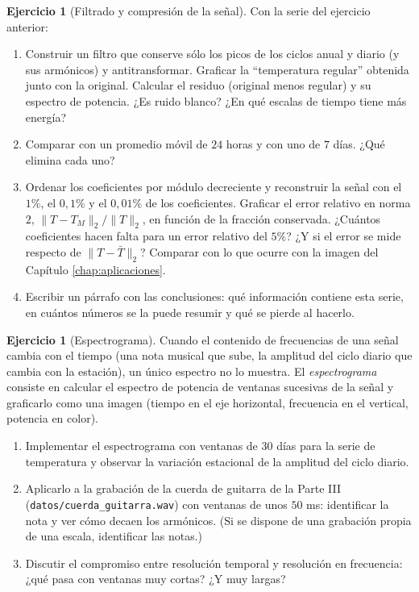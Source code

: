 \documentclass[12pt, a4paper]{amsbook}
\theoremstyle{remark}
\theoremstyle{definition}
\newtheorem{ejer}[teo]{Ejercicio}
\numberwithin{section}{chapter}
\numberwithin{subsection}{section}
\numberwithin{equation}{section}
\numberwithin{figure}{chapter}
\begin{document}
\begin{ejer}[Filtrado y compresión de la señal]
Con la serie del ejercicio anterior:
\begin{enumerate}
\item Construir un filtro que conserve sólo los picos de los ciclos anual y diario (y sus armónicos) y antitransformar. Graficar la ``temperatura regular'' obtenida junto con la original. Calcular el residuo (original menos regular) y su espectro de potencia. ¿Es ruido blanco? ¿En qué escalas de tiempo tiene más energía?
\item Comparar con un promedio móvil de $24$ horas y con uno de $7$ días. ¿Qué elimina cada uno?
\item Ordenar los coeficientes por módulo decreciente y reconstruir la señal con el $1\%$, el $0{,}1\%$ y el $0{,}01\%$ de los coeficientes. Graficar el error relativo en norma $2$, $\|T-T_M\|_2/\|T\|_2$, en función de la fracción conservada. ¿Cuántos coeficientes hacen falta para un error relativo del $5\%$? ¿Y si el error se mide respecto de $\|T-\bar T\|_2$? Comparar con lo que ocurre con la imagen del Capítulo \ref{chap:aplicaciones}.
\item Escribir un párrafo con las conclusiones: qué información contiene esta serie, en cuántos números se la puede resumir y qué se pierde al hacerlo.
\end{enumerate}
\end{ejer}

\begin{ejer}[Espectrograma]
Cuando el contenido de frecuencias de una señal cambia con el tiempo (una nota musical que sube, la amplitud del ciclo diario que cambia con la estación), un único espectro no lo muestra. El \emph{espectrograma} consiste en calcular el espectro de potencia de ventanas sucesivas de la señal y graficarlo como una imagen (tiempo en el eje horizontal, frecuencia en el vertical, potencia en color).
\begin{enumerate}
\item Implementar el espectrograma con ventanas de $30$ días para la serie de temperatura y observar la variación estacional de la amplitud del ciclo diario.
\item Aplicarlo a la grabación de la cuerda de guitarra de la Parte III (\nolinkurl{datos/cuerda_guitarra.wav}) con ventanas de unos $50$ ms: identificar la nota y ver cómo decaen los armónicos. (Si se dispone de una grabación propia de una escala, identificar las notas.)
\item Discutir el compromiso entre resolución temporal y resolución en frecuencia: ¿qué pasa con ventanas muy cortas? ¿Y muy largas?
\end{enumerate}
\end{ejer}
\end{document}
